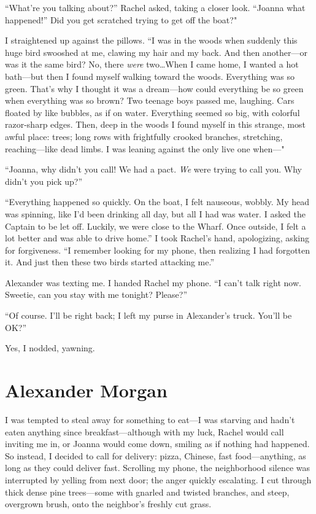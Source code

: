 ``What're you talking about?'' Rachel asked, taking a closer look.
``Joanna what happened!'' Did you get scratched trying to get off the
boat?"

I straightened up against the pillows. ``I was in the woods when suddenly
this huge bird swooshed at me, clawing my hair and my back. And then
another---or was it the same bird? No, there \emph{were} two\ldots When
I came home, I wanted a hot bath---but then I found myself walking
toward the woods. Everything was so green. That's why I thought it was a
dream---how could everything be so green when everything was so brown?
Two teenage boys passed me, laughing. Cars floated by like bubbles, as
if on water. Everything seemed so big, with colorful razor-sharp edges.
Then, deep in the woods I found myself in this strange, most awful
place: trees; long rows with frightfully crooked branches, stretching,
reaching---like dead limbs. I was leaning against the only live one
when---"

``Joanna, why didn't you call! We had a pact. \emph{We} were trying to
call you. Why didn't you pick up?''

``Everything happened so quickly. On the boat, I felt nauseous, wobbly.
My head was spinning, like I'd been drinking all day, but all I had was
water. I asked the Captain to be let off. Luckily, we were close to the
Wharf. Once outside, I felt a lot better and was able to drive home.'' I
took Rachel's hand, apologizing, asking for forgiveness. ``I remember
looking for my phone, then realizing I had forgotten it. And just then
these two birds started attacking me.''

Alexander was texting me. I handed Rachel my phone. ``I can't talk right
now. Sweetie, can you stay with me tonight? Please?''

``Of course. I'll be right back; I left my purse in Alexander's truck.
You'll be OK?''

Yes, I nodded, yawning.

\chapter{Alexander Morgan}

\titlemark

I was tempted to steal away for something to eat---I was starving and
hadn't eaten anything since breakfast---although with my luck, Rachel
would call inviting me in, or Joanna would come down, smiling as if
nothing had happened. So instead, I decided to call for delivery: pizza,
Chinese, fast food---anything, as long as they could deliver fast.
Scrolling my phone, the neighborhood silence was interrupted by yelling
from next door; the anger quickly escalating. I cut through thick dense
pine trees---some with gnarled and twisted branches, and steep,
overgrown brush, onto the neighbor's freshly cut grass.

